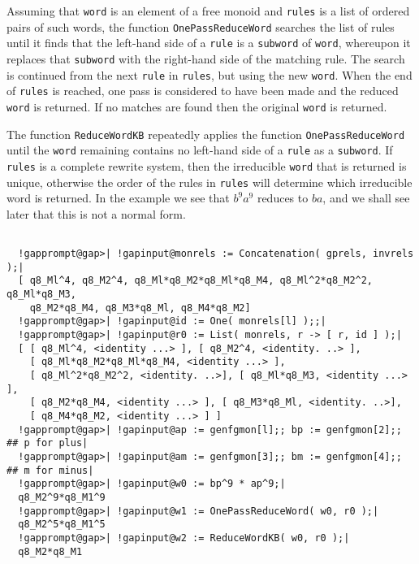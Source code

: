 \documentclass[a4paper,11pt]{report}
\begin{document}
{{{ Assuming that \texttt{word} is an element of a free monoid and \texttt{rules} is a list of ordered pairs of such words, the function \texttt{OnePassReduceWord} searches the list of rules until it finds that the left-hand side of a \texttt{rule} is a \texttt{subword} of \texttt{word}, whereupon it replaces that \texttt{subword} with the right-hand side of the matching rule. The search is continued from
the next \texttt{rule} in \texttt{rules}, but using the new \texttt{word}. When the end of \texttt{rules} is reached, one pass is considered to have been made and the reduced \texttt{word} is returned. If no matches are found then the original \texttt{word} is returned. 

 The function \texttt{ReduceWordKB} repeatedly applies the function \texttt{OnePassReduceWord} until the \texttt{word} remaining contains no left-hand side of a \texttt{rule} as a \texttt{subword}. If \texttt{rules} is a complete rewrite system, then the irreducible \texttt{word} that is returned is unique, otherwise the order of the rules in \texttt{rules} will determine which irreducible word is returned. In the example we see that $b^9a^9$ reduces to $ba$, and we shall see later that this is not a normal form. 

 }

 
\begin{Verbatim}[commandchars=!@|,fontsize=\small,frame=single,label=Example]
  
  !gapprompt@gap>| !gapinput@monrels := Concatenation( gprels, invrels );|
  [ q8_Ml^4, q8_M2^4, q8_Ml*q8_M2*q8_Ml*q8_M4, q8_Ml^2*q8_M2^2, q8_Ml*q8_M3, 
    q8_M2*q8_M4, q8_M3*q8_Ml, q8_M4*q8_M2] 
  !gapprompt@gap>| !gapinput@id := One( monrels[l] );;|
  !gapprompt@gap>| !gapinput@r0 := List( monrels, r -> [ r, id ] );|
  [ [ q8_Ml^4, <identity ...> ], [ q8_M2^4, <identity. ..> ], 
    [ q8_Ml*q8_M2*q8_Ml*q8_M4, <identity ...> ], 
    [ q8_Ml^2*q8_M2^2, <identity. ..>], [ q8_Ml*q8_M3, <identity ...> ], 
    [ q8_M2*q8_M4, <identity ...> ], [ q8_M3*q8_Ml, <identity. ..>], 
    [ q8_M4*q8_M2, <identity ...> ] ] 
  !gapprompt@gap>| !gapinput@ap := genfgmon[l];; bp := genfgmon[2];;   ## p for plus|
  !gapprompt@gap>| !gapinput@am := genfgmon[3];; bm := genfgmon[4];;   ## m for minus|
  !gapprompt@gap>| !gapinput@w0 := bp^9 * ap^9;|
  q8_M2^9*q8_M1^9
  !gapprompt@gap>| !gapinput@w1 := OnePassReduceWord( w0, r0 );|
  q8_M2^5*q8_M1^5
  !gapprompt@gap>| !gapinput@w2 := ReduceWordKB( w0, r0 );|
  q8_M2*q8_M1
  
\end{Verbatim}
 

}}
\end{document}
